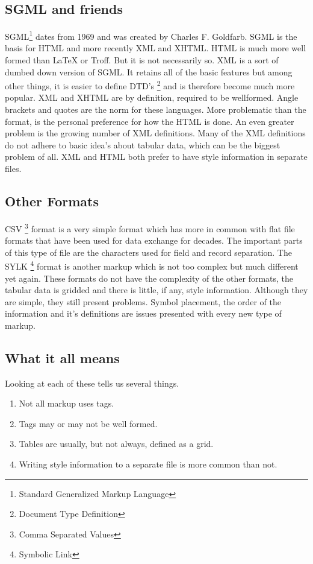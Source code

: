 \subsection{SGML and friends}
SGML\footnote{Standard Generalized Markup Language} dates from 1969 and was created by Charles F. Goldfarb.
SGML is the basis for HTML and more recently XML and XHTML.  HTML is much more well formed than LaTeX or
Troff.  But it is not necessarily so.  XML is a sort of dumbed down version of SGML.  It retains all
of the basic features but among other things, it is easier to define DTD's 
\footnote{Document Type Definition} and is therefore become much more popular.
XML and XHTML are by definition, required to be wellformed.  
Angle brackets and quotes are the norm for these languages.  More problematic than the format, is
the personal preference for how the HTML is done.  An even greater problem is the growing number
of XML definitions.  Many of the XML definitions do not adhere to basic idea's about tabular data,
which can be the biggest problem of all.   XML and HTML both prefer to have style information in
separate files.

\subsection{Other Formats}
CSV \footnote{Comma Separated Values} 
format is a very simple format which has more in common with flat file formats that have been
used for data exchange for decades.  The important parts of this type of file are the characters
used for field and record separation.  The SYLK \footnote{Symbolic Link} format is another markup
which is not too complex but much different yet again.  These formats do not have the complexity
of the other formats, the tabular data is gridded and there is little, if any, style information.
Although they are simple, they still present problems.  Symbol placement,
the order of the information and it's definitions are issues presented with every new type of markup.

\subsection{What it all means}
Looking at each of these tells us several things.  

\begin{enumerate} 
\item Not all markup uses tags.
\item Tags may or may not be well formed.
\item Tables are usually, but not always, defined as a grid.
\item Writing style information to a separate file is more common than not.
\end{enumerate}

